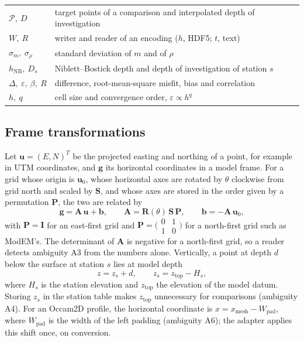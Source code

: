\documentclass[manuscript]{geophysics}
\begin{document}
{\begin{tabular}{@{}L{2.6cm}L{11.8cm}@{}}
$\mathcal{P},\ D$ & target points of a comparison and interpolated depth of investigation \\
$W,\ R$ & writer and reader of an encoding ($h$, HDF5; $t$, text) \\
$\sigma_m,\ \sigma_\rho$ & standard deviation of $m$ and of $\rho$ \\
$h_{\mathrm{NB}},\ D_s$ & Niblett--Bostick depth and depth of investigation of station $s$ \\
$\Delta,\ \varepsilon,\ \beta,\ R$ & difference, root-mean-square misfit, bias and correlation \\
$h,\ q$ & cell size and convergence order, $\varepsilon \propto h^{q}$ \\
\bottomrule
\end{tabular}
}

\subsection{Frame transformations}

Let $\mathbf{u} = (E, N)^{T}$ be the projected easting and northing of
a point, for example in UTM coordinates, and $\mathbf{g}$ its
horizontal coordinates in a model frame. For a grid whose origin is
$\mathbf{u}_0$, whose horizontal axes are rotated by $\theta$
clockwise from grid north and scaled by $\mathbf{S}$, and whose axes
are stored in the order given by a permutation $\mathbf{P}$, the two
are related by
\begin{equation}
\mathbf{g} = \mathbf{A}\,\mathbf{u} + \mathbf{b},
\qquad
\mathbf{A} = \mathbf{R}(\theta)\,\mathbf{S}\,\mathbf{P},
\qquad
\mathbf{b} = -\mathbf{A}\,\mathbf{u}_0 ,
\label{eq:frame}
\end{equation}
with $\mathbf{P} = \mathbf{I}$ for an east-first grid and
$\mathbf{P} = \bigl(\begin{smallmatrix}0 & 1\\ 1 & 0\end{smallmatrix}\bigr)$
for a north-first grid such as ModEM's. The determinant of $\mathbf{A}$
is negative for a north-first grid, so a reader detects ambiguity A3
from the numbers alone. Vertically, a point at depth $d$
below the surface at station $s$ lies at model depth
\begin{equation}
z = z_s + d,
\qquad
z_s = z_{\mathrm{top}} - H_s ,
\label{eq:datum}
\end{equation}
where $H_s$ is the station elevation and $z_{\mathrm{top}}$ the
elevation of the model datum. Storing $z_s$ in the station table makes
$z_{\mathrm{top}}$ unnecessary for comparisons (ambiguity A4). For an
Occam2D profile, the horizontal coordinate is $x = x_{\mathrm{mesh}} -
W_{\mathrm{pad}}$, where $W_{\mathrm{pad}}$ is the width of the left
padding (ambiguity A6); the adapter applies this shift once, on
conversion.
\end{document}
